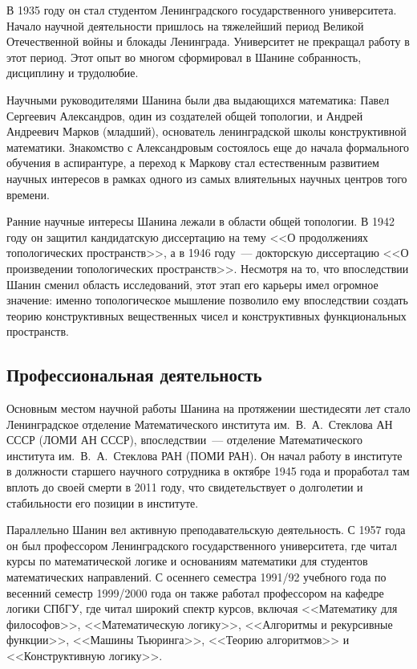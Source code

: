 \documentclass[essay,paper]{pmk-graduate}
\begin{document}
В 1935 году он стал студентом Ленинградского государственного университета. Начало научной деятельности пришлось на тяжелейший период Великой Отечественной войны и блокады Ленинграда. Университет не прекращал работу в этот период. Этот опыт во многом сформировал в Шанине собранность, дисциплину и трудолюбие.

Научными руководителями Шанина были два выдающихся математика: Павел Сергеевич Александров, один из создателей общей топологии, и Андрей Андреевич Марков (младший), основатель ленинградской школы конструктивной математики. Знакомство с Александровым состоялось еще до начала формального обучения в аспирантуре, а переход к Маркову стал естественным развитием научных интересов в рамках одного из самых влиятельных научных центров того времени.

Ранние научные интересы Шанина лежали в области общей топологии. В 1942 году он защитил кандидатскую диссертацию на тему <<О продолжениях топологических пространств>>, а в 1946 году~--- докторскую диссертацию <<О произведении топологических пространств>>. Несмотря на то, что впоследствии Шанин сменил область исследований, этот этап его карьеры имел огромное значение: именно топологическое мышление позволило ему впоследствии создать теорию конструктивных вещественных чисел и конструктивных функциональных пространств.

\subsection{Профессиональная деятельность}

Основным местом научной работы Шанина на протяжении  шестидесяти лет стало Ленинградское отделение Математического института им.~В.~А.~Стеклова АН СССР (ЛОМИ АН СССР), впоследствии~--- отделение Математического института им.~В.~А.~Стеклова РАН (ПОМИ РАН). Он начал работу в институте в должности старшего научного сотрудника в октябре 1945 года и проработал там вплоть до своей смерти в 2011 году, что свидетельствует о долголетии и стабильности его позиции в институте.

Параллельно Шанин вел активную преподавательскую деятельность. С 1957 года он был профессором Ленинградского государственного университета, где читал курсы по математической логике и основаниям математики для студентов математических направлений. С осеннего семестра 1991/92 учебного года по весенний семестр 1999/2000 года он также работал профессором на кафедре логики СПбГУ, где читал широкий спектр курсов, включая <<Математику для философов>>, <<Математическую логику>>, <<Алгоритмы и рекурсивные функции>>, <<Машины Тьюринга>>, <<Теорию алгоритмов>> и <<Конструктивную логику>>.
\end{document}
